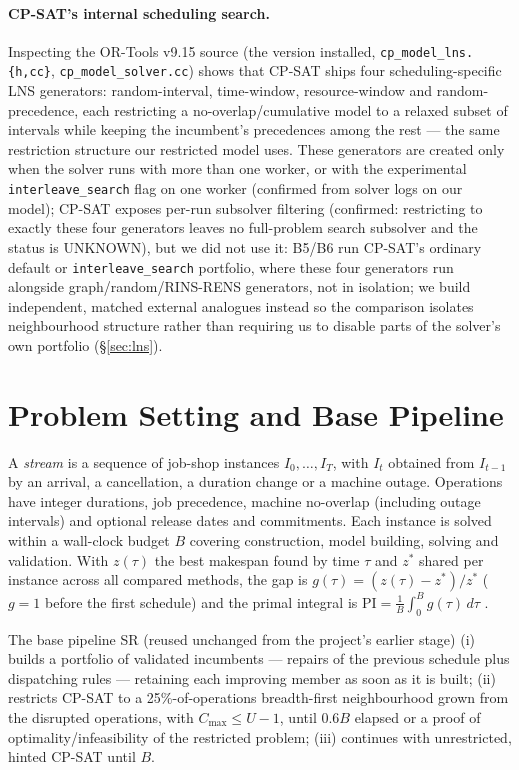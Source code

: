 \documentclass[letterpaper]{article} %
\newcommand{\base}{\textsc{SR}}
\begin{document}
\paragraph{CP-SAT's internal scheduling search.} Inspecting the OR-Tools v9.15 source (the version installed, \texttt{cp\_model\_lns.\{h,cc\}}, \texttt{cp\_model\_solver.cc}) shows that CP-SAT ships four scheduling-specific LNS generators: random-interval, time-window, resource-window and random-precedence, each restricting a no-overlap/cumulative model to a relaxed subset of intervals while keeping the incumbent's precedences among the rest --- the same restriction structure our restricted model uses. These generators are created only when the solver runs with more than one worker, or with the experimental \texttt{interleave\_search} flag on one worker (confirmed from solver logs on our model); CP-SAT exposes per-run subsolver filtering (confirmed: restricting to exactly these four generators leaves no full-problem search subsolver and the status is UNKNOWN), but we did not use it: B5/B6 run CP-SAT's ordinary default or \texttt{interleave\_search} portfolio, where these four generators run alongside graph/random/RINS-RENS generators, not in isolation; we build independent, matched external analogues instead so the comparison isolates neighbourhood structure rather than requiring us to disable parts of the solver's own portfolio (\S\ref{sec:lns}).

\section{Problem Setting and Base Pipeline}

A \emph{stream} is a sequence of job-shop instances $I_0,\dots,I_T$, with $I_t$ obtained from $I_{t-1}$ by an arrival, a cancellation, a duration change or a machine outage. Operations have integer durations, job precedence, machine no-overlap (including outage intervals) and optional release dates and commitments. Each instance is solved within a wall-clock budget $B$ covering construction, model building, solving and validation. With $z(\tau)$ the best makespan found by time $\tau$ and $z^*$ shared per instance across all compared methods, the gap is $g(\tau)=(z(\tau)-z^*)/z^*$ ($g=1$ before the first schedule) and the primal integral is $\mathrm{PI}=\frac1B\int_0^B g(\tau)\,d\tau$ \citep{berthold2013}.

The base pipeline \base{} (reused unchanged from the project's earlier stage) (i) builds a portfolio of validated incumbents --- repairs of the previous schedule plus dispatching rules --- retaining each improving member as soon as it is built; (ii) restricts CP-SAT to a 25\%-of-operations breadth-first neighbourhood grown from the disrupted operations, with $C_{\max}\le U-1$, until $0.6B$ elapsed or a proof of optimality/infeasibility of the restricted problem; (iii) continues with unrestricted, hinted CP-SAT until $B$.
\end{document}
